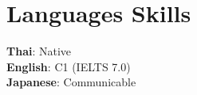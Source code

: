 \documentclass[letterpaper,11pt]{article}
\begin{document}
\section{Languages Skills}
 \begin{itemize}[leftmargin=0.15in, label={}]
    \small{\item{
     \textbf{Thai}{: Native} \\
     \textbf{English}{: C1 (IELTS 7.0)} \\
     \textbf{Japanese}{: Communicable} \\
    }}
 \end{itemize}


\end{document}
